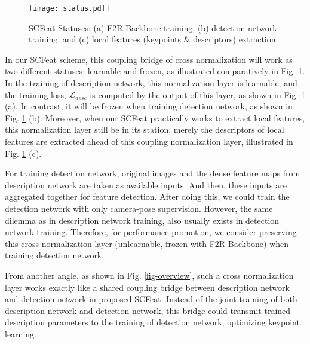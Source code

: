\documentclass[journal]{IEEEtran}
\begin{document}
\begin{figure}[h]
\centering
\texttt{[image: status.pdf]} \caption{SCFeat Statuses: (a) F2R-Backbone training, (b) detection network training, and (c) local features (keypoints \& descriptors) extraction.}
\label{fig_cnstatus}
\end{figure}

In our SCFeat scheme, this coupling bridge of cross normalization will work as two different statuses: learnable and frozen, as illustrated comparatively in Fig. \ref{fig_cnstatus}. In the training of description network, this normalization layer is learnable, and the training loss, $\mathcal{L}_{desc}$ is computed by the output of this layer, as shown in Fig. \ref{fig_cnstatus} (a). In contrast, it will be frozen when training detection network, as shown in Fig. \ref{fig_cnstatus} (b). Moreover, when our SCFeat practically works to extract local features, this normalization layer still be in its station, merely the descriptors of local features are extracted ahead of this coupling normalization layer, illustrated in Fig. \ref{fig_cnstatus} (c).




For training detection network, original images and the dense feature maps from description network are taken as available inputs. And then, these inputs are aggregated together for feature detection. After doing this, we could train the detection network with only camera-pose supervision. However, the same dilemma as in description network training, also usually exists in detection network training. 
Therefore, for performance promotion, we consider preserving this cross-normalization layer (unlearnable, frozen with F2R-Backbone) when training detection network. 


From another angle, as shown in Fig. \ref{fig-overview}, such a cross normalization layer works exactly like a shared coupling bridge between description network and detection network in proposed SCFeat. 
Instead of the joint training of both description network and detection network, this bridge could transmit trained description parameters to the training of detection network, optimizing keypoint learning.
\end{document}
